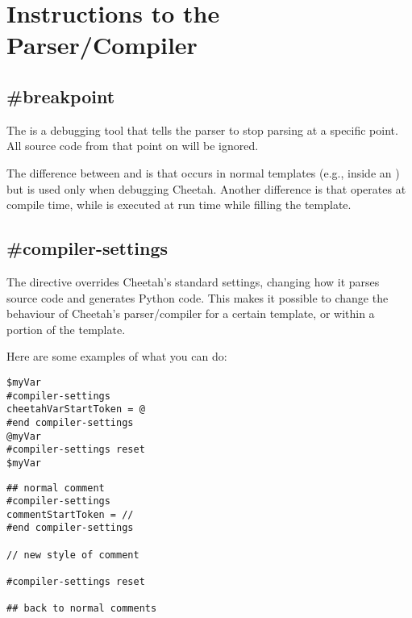\section{Instructions to the Parser/Compiler}
\label{parserInstructions}


\subsection{\#breakpoint}
\label{parserInstructions.breakpoint}

The  is a debugging tool that tells the parser to stop
parsing at a specific point. All source code from that point on will be ignored.

The difference between  and  is that
 occurs in normal templates (e.g., inside an ) but
 is used only when debugging Cheetah.  Another difference is
that  operates at compile time, while  is
executed at run time while filling the template.


\subsection{\#compiler-settings}
\label{parserInstructions.settings}

The  directive overrides Cheetah's standard settings,
changing how it parses source code and generates Python code.  This
makes it possible to change the behaviour of Cheetah's parser/compiler for a
certain template, or within a portion of the template.

Here are some examples of what you can do:
\begin{verbatim}
$myVar
#compiler-settings
cheetahVarStartToken = @
#end compiler-settings
@myVar
#compiler-settings reset
$myVar
\end{verbatim}


\begin{verbatim}
## normal comment
#compiler-settings
commentStartToken = //
#end compiler-settings

// new style of comment

#compiler-settings reset

## back to normal comments
\end{verbatim}

